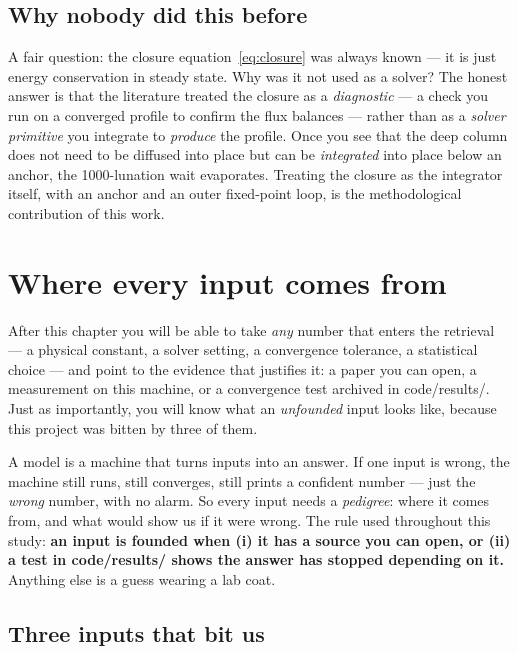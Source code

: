 \documentclass[11pt]{report}
\newcommand{\code}[1]{{\ttfamily\small #1}}
\begin{document}
\section{Why nobody did this before}

A fair question: the closure equation~\eqref{eq:closure} was always known --- it
is just energy conservation in steady state. Why was it not used as a solver? The
honest answer is that the literature treated the closure as a \emph{diagnostic}
--- a check you run on a converged profile to confirm the flux balances --- rather
than as a \emph{solver primitive} you integrate to \emph{produce} the profile.
Once you see that the deep column does not need to be diffused into place but can
be \emph{integrated} into place below an anchor, the 1000-lunation wait
evaporates. Treating the closure as the integrator itself, with an anchor and an
outer fixed-point loop, is the methodological contribution of this work.

\chapter{Where every input comes from}\label{ch:inputs}

After this chapter you will be able to take \emph{any} number that enters the
retrieval --- a physical constant, a solver setting, a convergence tolerance, a
statistical choice --- and point to the evidence that justifies it: a paper you
can open, a measurement on this machine, or a convergence test archived in
\code{code/results/}. Just as importantly, you will know what an \emph{unfounded}
input looks like, because this project was bitten by three of them.

\begin{plain}
A model is a machine that turns inputs into an answer. If one input is wrong,
the machine still runs, still converges, still prints a confident number ---
just the \emph{wrong} number, with no alarm. So every input needs a
\emph{pedigree}: where it comes from, and what would show us if it were wrong.
The rule used throughout this study: \textbf{an input is founded when (i) it
has a source you can open, or (ii) a test in \code{code/results/} shows the answer
has stopped depending on it.} Anything else is a guess wearing a lab coat.
\end{plain}

\section{Three inputs that bit us}\label{sec:threebites}
\end{document}
